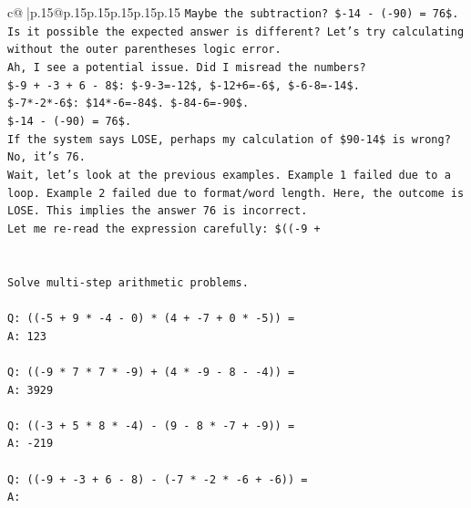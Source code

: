 \documentclass{article}
\begin{document}
{\begin{supertabular}{c@{$\;$}|p{.15\linewidth}@{}p{.15\linewidth}p{.15\linewidth}p{.15\linewidth}p{.15\linewidth}p{.15\linewidth}}
{{{\texttt{Maybe the subtraction? \${-}14 {-} ({-}90) = 76\$.} \\
\texttt{Is it possible the expected answer is different? Let's try calculating without the outer parentheses logic error.} \\
\texttt{Ah, I see a potential issue. Did I misread the numbers?} \\
\texttt{\${-}9 + {-}3 + 6 {-} 8\$: \${-}9{-}3={-}12\$, \${-}12+6={-}6\$, \${-}6{-}8={-}14\$.} \\
\texttt{\${-}7*{-}2*{-}6\$: \$14*{-}6={-}84\$. \${-}84{-}6={-}90\$.} \\
\texttt{\${-}14 {-} ({-}90) = 76\$.} \\
\texttt{If the system says LOSE, perhaps my calculation of \$90{-}14\$ is wrong? No, it's 76.} \\
\texttt{Wait, let's look at the previous examples. Example 1 failed due to a loop. Example 2 failed due to format/word length. Here, the outcome is LOSE. This implies the answer 76 is incorrect.} \\
\texttt{Let me re{-}read the expression carefully: \$(({-}9 +} \\
\\ 
\\ 
\texttt{Solve multi{-}step arithmetic problems.} \\
\\ 
\texttt{Q: (({-}5 + 9 * {-}4 {-} 0) * (4 + {-}7 + 0 * {-}5)) =} \\
\texttt{A: 123} \\
\\ 
\texttt{Q: (({-}9 * 7 * 7 * {-}9) + (4 * {-}9 {-} 8 {-} {-}4)) =} \\
\texttt{A: 3929} \\
\\ 
\texttt{Q: (({-}3 + 5 * 8 * {-}4) {-} (9 {-} 8 * {-}7 + {-}9)) =} \\
\texttt{A: {-}219} \\
\\ 
\texttt{Q: (({-}9 + {-}3 + 6 {-} 8) {-} ({-}7 * {-}2 * {-}6 + {-}6)) =} \\
\texttt{A:} \\
            }
        }
    }
     \\ \\


\end{supertabular}}
\end{document}
